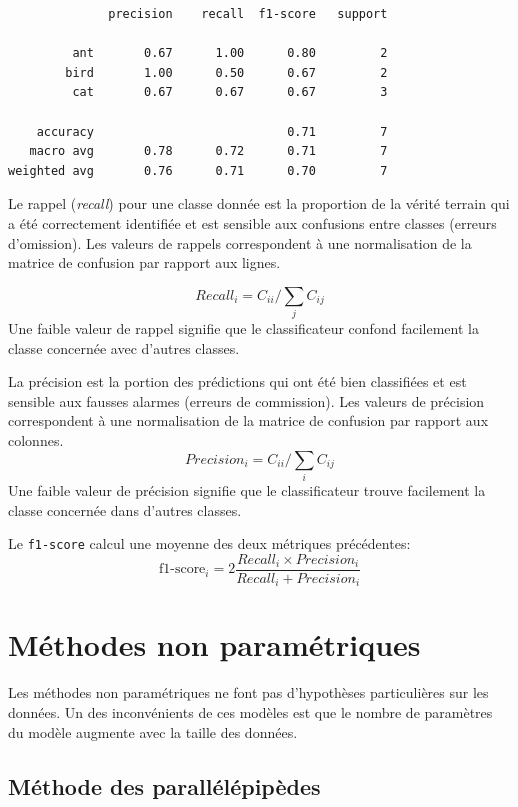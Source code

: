 \documentclass[
  french,
  11pt,
  letterpaper,
  open=any,
  twoside=false,
  french]{scrbook}
\begin{document}
\begin{verbatim}
              precision    recall  f1-score   support

         ant       0.67      1.00      0.80         2
        bird       1.00      0.50      0.67         2
         cat       0.67      0.67      0.67         3

    accuracy                           0.71         7
   macro avg       0.78      0.72      0.71         7
weighted avg       0.76      0.71      0.70         7
\end{verbatim}

Le rappel (\emph{recall}) pour une classe donnée est la proportion de la
vérité terrain qui a été correctement identifiée et est sensible aux
confusions entre classes (erreurs d'omission). Les valeurs de rappels
correspondent à une normalisation de la matrice de confusion par rapport
aux lignes.

\[
Recall_i= C_{ii} / \sum_j C_{ij}
\] Une faible valeur de rappel signifie que le classificateur confond
facilement la classe concernée avec d'autres classes.

La précision est la portion des prédictions qui ont été bien classifiées
et est sensible aux fausses alarmes (erreurs de commission). Les valeurs
de précision correspondent à une normalisation de la matrice de
confusion par rapport aux colonnes. \[
Precision_i= C_{ii} / \sum_i C_{ij}
\] Une faible valeur de précision signifie que le classificateur trouve
facilement la classe concernée dans d'autres classes.

Le \texttt{f1-score} calcul une moyenne des deux métriques précédentes:
\[
\text{f1-score}_i=2\frac{Recall_i \times Precision_i}{Recall_i + Precision_i}
\]

\section{Méthodes non
paramétriques}\label{muxe9thodes-non-paramuxe9triques}

Les méthodes non paramétriques ne font pas d'hypothèses particulières
sur les données. Un des inconvénients de ces modèles est que le nombre
de paramètres du modèle augmente avec la taille des données.

\subsection{Méthode des parallélépipèdes}\label{sec-0511}
\end{document}
